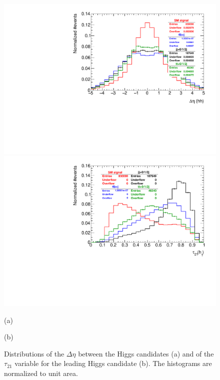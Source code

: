 \begin{figure}
	\centering
	\begin{minipage}{.5\textwidth}
		\centering
		\includegraphics[trim={.65cm 0 0 0},clip,width=\linewidth]{./Figures/hist_hh_deltaEta.pdf}
	\end{minipage}%
	\begin{minipage}{.5\textwidth}
		\centering
		\includegraphics[trim={0 0 .65cm 0},clip,width=\linewidth]{./Figures/hist_h1_tau21.pdf}
	\end{minipage}
	\begin{minipage}[t]{0.5\textwidth}
		\caption*{(a)}
	\end{minipage}%
	\hfill
	\begin{minipage}[t]{0.5\textwidth}
		\caption*{(b)}
	\end{minipage}
	\caption{Distributions of the $\Delta\eta$ between the Higgs candidates (a) and of the $\tau_{21}$ variable for the leading Higgs candidate (b).  The histograms are normalized to unit area.}
	\label{fig:hh_deltaEta_h1_tau21}
\end{figure}
	

